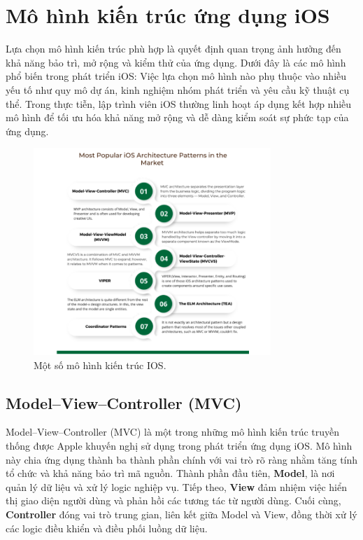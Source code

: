 \section{Mô hình kiến trúc ứng dụng iOS}
\hspace*{0.8cm}Lựa chọn mô hình kiến trúc phù hợp là quyết định quan trọng ảnh hưởng đến khả năng bảo trì, mở rộng và kiểm thử của ứng dụng. Dưới đây là các mô hình phổ biến trong phát triển iOS:
Việc lựa chọn mô hình nào phụ thuộc vào nhiều yếu tố như quy mô dự án, kinh nghiệm nhóm phát triển và yêu cầu kỹ thuật cụ thể. Trong thực tiễn, lập trình viên iOS thường linh hoạt áp dụng kết hợp nhiều mô hình để tối ưu hóa khả năng mở rộng và dễ dàng kiểm soát sự phức tạp của ứng dụng.

\begin{figure}[H] 
    \centering
    \includegraphics[width=0.8\textwidth]{images/mohinhkientrucios.png}
     \caption{Một số mô hình kiến trúc IOS\cite{MôHinhIOS}.}
    \label{fig:mohinhkientrucios}
\end{figure}
\subsection{Model–View–Controller (MVC)}
\hspace*{0.8cm}Model–View–Controller (MVC) là một trong những mô hình kiến trúc truyền thống được Apple khuyến nghị sử dụng trong phát triển ứng dụng iOS. Mô hình này chia ứng dụng thành ba thành phần chính với vai trò rõ ràng nhằm tăng tính tổ chức và khả năng bảo trì mã nguồn.
  Thành phần đầu tiên, \textbf{Model}, là nơi quản lý dữ liệu và xử lý logic nghiệp vụ. Tiếp theo, \textbf{View} đảm nhiệm việc hiển thị giao diện người dùng và phản hồi các tương tác từ người dùng. Cuối cùng, \textbf{Controller} đóng vai trò trung gian, liên kết giữa Model và View, đồng thời xử lý các logic điều khiển và điều phối luồng dữ liệu.

